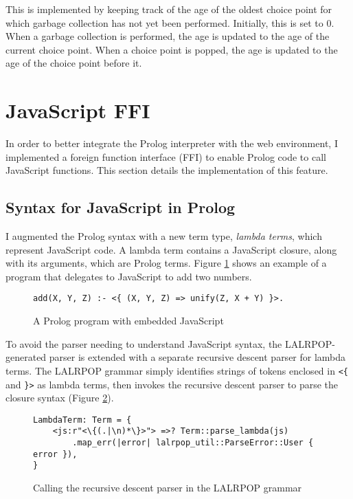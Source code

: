 This is implemented by keeping track of the age of the oldest choice point for which garbage collection has not yet been performed. Initially, this is set to 0. When a garbage collection is performed, the age is updated to the age of the current choice point. When a choice point is popped, the age is updated to the age of the choice point before it.

\section{JavaScript FFI}

\label{sec:js-ffi}

In order to better integrate the Prolog interpreter with the web environment, I implemented a foreign function interface (FFI) to enable Prolog code to call JavaScript functions. This section details the implementation of this feature.

\subsection{Syntax for JavaScript in Prolog}

I augmented the Prolog syntax with a new term type, \emph{lambda terms}, which represent JavaScript code. A lambda term contains a JavaScript closure, along with its arguments, which are Prolog terms. Figure \ref{fig:js-in-prolog} shows an example of a program that delegates to JavaScript to add two numbers.

\begin{figure}[H]
\centering
\begin{verbatim}
add(X, Y, Z) :- <{ (X, Y, Z) => unify(Z, X + Y) }>.
\end{verbatim}
\caption{A Prolog program with embedded JavaScript}
\label{fig:js-in-prolog}
\end{figure}

To avoid the parser needing to understand JavaScript syntax, the LALRPOP-generated parser is extended with a separate recursive descent parser for lambda terms. The LALRPOP grammar simply identifies strings of tokens enclosed in \texttt{<\{} and \texttt{\}>} as lambda terms, then invokes the recursive descent parser to parse the closure syntax (Figure \ref{fig:js-grammar}).

\begin{figure}[H]
\centering
\begin{verbatim}
LambdaTerm: Term = {
    <js:r"<\{(.|\n)*\}>"> =>? Term::parse_lambda(js)
        .map_err(|error| lalrpop_util::ParseError::User { error }),
}
\end{verbatim}
\caption{Calling the recursive descent parser in the LALRPOP grammar}
\label{fig:js-grammar}
\end{figure}

